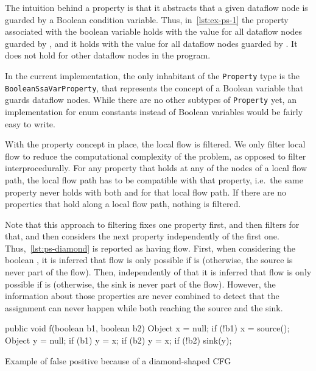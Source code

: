 The intuition behind a property is that it abstracts that a given 
dataflow node is guarded by a Boolean condition variable.
Thus, in~\autoref{lst:ex-ps-1} the property associated with the boolean variable 
holds with the value  for all dataflow nodes guarded by
, and it holds with the value  for all dataflow nodes 
guarded by .
It does not hold for other dataflow nodes in the program.

In the current implementation, the only inhabitant of the \texttt{Property}
type is the \texttt{BooleanSsaVarProperty}, that represents the concept of
a Boolean variable that guards dataflow nodes.
While there are no other subtypes of \texttt{Property} yet, an implementation
for enum constants instead of Boolean variables would be fairly easy to write.

With the property concept in place, the local flow 
is filtered.
We only filter local flow to reduce the computational complexity of the problem,
as opposed to filter interprocedurally.
For any property that holds at any of the nodes of a local flow path,
the local flow path has to be compatible with that property, i.e.\ the same 
property never holds with both  and  for that local flow path.
If there are no properties that hold along a local flow path, nothing is filtered.

Note that this approach to filtering fixes one property first, and then filters 
for that, and then considers the next property independently of the first one.
Thus,~\autoref{lst:ps-diamond} is reported as having flow.
First, when considering the boolean , it is inferred that flow is only 
possible if  is  
(otherwise, the source is never part of the flow).
Then, independently of that it is inferred that flow is only possible if 
is  (otherwise, the sink is never part of the flow).
However, the information about those properties are never combined to detect 
that the assignment  can never happen while both reaching the 
source and the sink.

\begin{listing}
    \begin{javacode}
public void f(boolean b1, boolean b2) {
    Object x = null;
    if (!b1) {
        x = source();
    }
    Object y = null;
    if (b1) {
        y = x;
    }
    if (b2) {
        y = x;
    }
    if (!b2) {
        sink(y);
    }
}
    \end{javacode}
    \caption{Example of false positive because of a diamond-shaped CFG}
    \label{lst:ps-diamond}
\end{listing}

